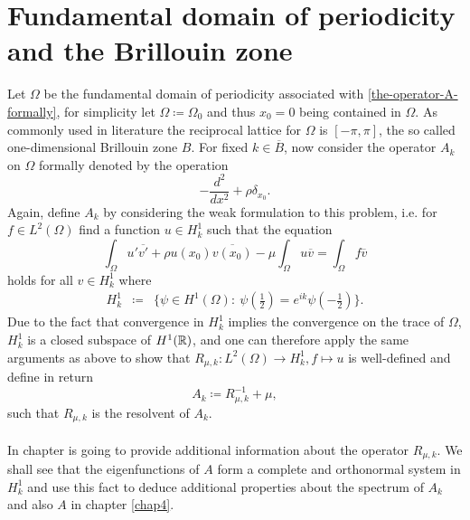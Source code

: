 \chapter{Fundamental domain of periodicity and the Brillouin zone}

Let $\Omega$ be the fundamental domain of periodicity associated with \eqref{the-operator-A-formally}, for simplicity let $\Omega \coloneqq \Omega_{0}$ and thus $x_{0} = 0$ being contained in $\Omega$. As commonly used in literature the reciprocal lattice for $\Omega$ is $[-\pi, \pi]$, the so called one-dimensional Brillouin zone $B$. For fixed $k \in \overline{B}$, now consider the operator $A_{k}$ on $\Omega$ formally denoted by the operation %
	\[ -\frac{d^{2}}{dx^{2}} + \rho \delta_{x_{0}}. \]
Again, define $A_{k}$ by considering the weak formulation to this problem, i.e. for $f \in L^{2}(\Omega)$ find a function $u \in H^{1}_{k}$ such that the equation
	\[ \int_{\Omega} u' \overline{v'} + \rho u(x_{0}) \overline{v(x_{0})} - \mu \int_{\Omega} u \overline{v} = \int_{\Omega} f \overline{v} \]
holds for all $v \in H^{1}_{k}$ where 
	\begin{eqnarray}
		H^{1}_{k} & \coloneqq & \Big\{ \psi \in H^{1}(\Omega): ~ \psi(\frac{1}{2}) = e^{ik} \psi(-\frac{1}{2}) \Big\}. \label{quasi-periodic-condition}
	\end{eqnarray}
Due to the fact that convergence in $H^{1}_{k}$ implies the convergence on the trace of $\Omega$, $H^{1}_{k}$ is a closed subspace of $H^{1}(\mathbb{R})$, and one can therefore apply the same arguments as above to show that $R_{\mu, k} \colon L^{2}(\Omega) \rightarrow H^{1}_{k}, f \mapsto u$ is well-defined and define in return %
	\[ A_{k} \coloneqq R_{\mu, k}^{-1} + \mu, \] 
such that $R_{\mu, k}$ is the resolvent of $A_{k}$.	
~\\ ~\\
In chapter is going to provide additional information about the operator $R_{\mu, k}$. We shall see that the eigenfunctions of $A$ form a complete and orthonormal system in $H^{1}_{k}$ and use this fact to deduce additional properties about the spectrum of $A_{k}$ and also $A$ in chapter \ref{chap4}.

